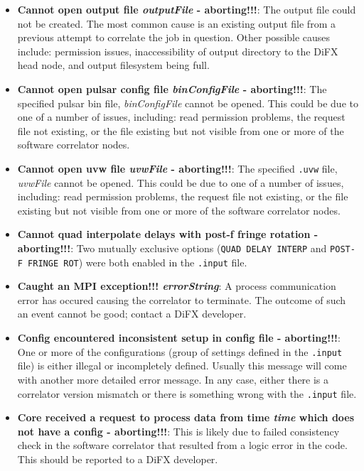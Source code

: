 \begin{itemize}
\item {\bf Cannot open output file {\it outputFile} - aborting!!!}:
The output file could not be created.
The most common cause is an existing output file from a previous attempt to correlate the job in question.
Other possible causes include: permission issues, inaccessibility of output directory to the DiFX head node, and output filesystem being full.

\item {\bf Cannot open pulsar config file {\it binConfigFile} - aborting!!!}:
The specified pulsar bin file, {\it binConfigFile} cannot be opened.
This could be due to one of a number of issues, including: read permission problems, the request file not existing, or the file existing but not visible from one or more of the software correlator nodes.

\item {\bf Cannot open uvw file {\it uvwFile} - aborting!!!}:
The specified {\tt .uvw} file, {\it uvwFile} cannot be opened.
This could be due to one of a number of issues, including: read permission problems, the request file not existing, or the file existing but not visible from one or more of the software correlator nodes.

\item {\bf Cannot quad interpolate delays with post-f fringe rotation - aborting!!!}:
Two mutually exclusive options ({\tt QUAD DELAY INTERP} and {\tt POST-F FRINGE ROT}) were both enabled in the {\tt .input} file.

\item {\bf Caught an MPI exception!!! {\it errorString}}:
A process communication error has occured causing the correlator to terminate.
The outcome of such an event cannot be good; contact a DiFX developer.

\item {\bf Config encountered inconsistent setup in config file - aborting!!!}:
One or more of the configurations (group of settings defined in the {\tt .input} file) is either illegal or incompletely defined.
Usually this message will come with another more detailed error message.
In any case, either there is a correlator version mismatch or there is something wrong with the {\tt .input} file.

\item {\bf Core received a request to process data from time {\it time} which does not have a config - aborting!!!}:
This is likely due to failed consistency check in the software correlator that resulted from a logic error in the code.
This should be reported to a DiFX developer.


\end{itemize}

